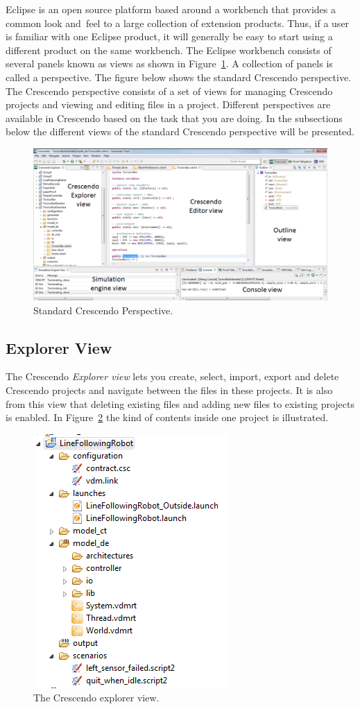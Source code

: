 \documentclass{crescendorepchap}
\begin{document}
Eclipse is an open source platform based around a workbench that
provides a common look and~feel to a large collection of extension
products. Thus, if a user is familiar with one Eclipse product, it will
generally be easy to start using a different product on the same
workbench. The Eclipse workbench consists of several panels known as
views as shown in Figure~\ref{fig:DestecsStartScreen}. 
A collection of panels is called a perspective. The figure below
shows the standard Crescendo perspective. The Crescendo perspective consists
of a set of views for managing Crescendo projects and viewing and editing
files in a project. Different perspectives are available in Crescendo
based on the task that you are doing. In the subsections below the different views of the standard Crescendo perspective will be presented.

\begin{figure}[htbp]
\centering
\includegraphics[width=.8\textwidth]{images/DestecsWorkbenchOutline.png}
\caption{Standard Crescendo Perspective.\label{fig:DestecsStartScreen}}
\end{figure}

\subsection{Explorer View}\label{subsec:explorer}

The Crescendo \emph{Explorer view} lets you create, select, import, export and delete Crescendo
projects and navigate between the files in these projects. It is also from this view that deleting existing files and
adding new files to existing projects is enabled. In Figure~\ref{fig:explorerview} the kind of contents inside one project is illustrated.

\begin{figure}[htbp]
\centering
\includegraphics[width=.3\textwidth]{images/DestecsExplorer.png}
\caption{The Crescendo explorer view.\label{fig:explorerview}}
\end{figure}
\end{document}
